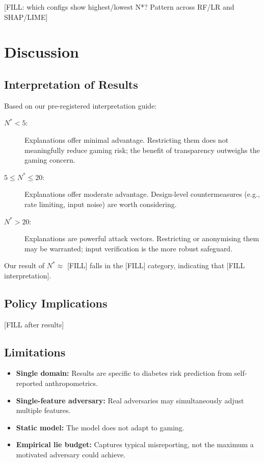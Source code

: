 \documentclass[12pt, a4paper, oneside]{report}
\theoremstyle{definition}
\begin{document}
[FILL: which configs show highest/lowest N*? Pattern across RF/LR and SHAP/LIME]

\chapter{Discussion}
\label{chap:discussion}

\section{Interpretation of Results}

Based on our pre-registered interpretation guide:
\begin{description}
  \item[$N^* < 5$:] Explanations offer minimal advantage. Restricting
       them does not meaningfully reduce gaming risk; the benefit of
       transparency outweighs the gaming concern.
  \item[$5 \leq N^* \leq 20$:] Explanations offer moderate advantage.
       Design-level countermeasures (e.g., rate limiting, input noise)
       are worth considering.
  \item[$N^* > 20$:] Explanations are powerful attack vectors.
       Restricting or anonymising them may be warranted; input
       verification is the more robust safeguard.
\end{description}

Our result of $N^* \approx$ [FILL] falls in the [FILL] category,
indicating that [FILL interpretation].

\section{Policy Implications}

[FILL after results]

\section{Limitations}

\begin{itemize}
  \item \textbf{Single domain:} Results are specific to diabetes risk
        prediction from self-reported anthropometrics.
  \item \textbf{Single-feature adversary:} Real adversaries may
        simultaneously adjust multiple features.
  \item \textbf{Static model:} The model does not adapt to gaming.
  \item \textbf{Empirical lie budget:} Captures typical misreporting,
        not the maximum a motivated adversary could achieve.
\end{itemize}
\end{document}
